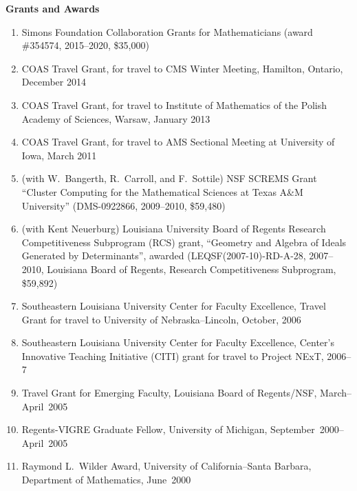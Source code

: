 \documentclass[12pt]{article}
\begin{document}




\textbf{Grants and Awards}
\begin{enumerate}
\item Simons Foundation Collaboration Grants for Mathematicians (award \#354574, 2015--2020, \$35,000)
\item COAS Travel Grant, for travel to CMS Winter Meeting, Hamilton, Ontario, December 2014
\item COAS Travel Grant, for travel to Institute of Mathematics of the Polish Academy of Sciences, Warsaw, January 2013
\item COAS Travel Grant, for travel to AMS Sectional Meeting at University of Iowa, March 2011
\item (with W.~Bangerth, R.~Carroll, and F.~Sottile)
NSF SCREMS Grant ``Cluster Computing for the 
Mathematical Sciences at Texas A\&M University''
(DMS-0922866, 2009--2010, \$59,480)
\item (with Kent Neuerburg)
Louisiana University Board of Regents Research Competitiveness Subprogram (RCS) grant,
``Geometry and Algebra of Ideals Generated by Determinants'',
awarded 
(LEQSF(2007-10)-RD-A-28, 2007--2010, Louisiana Board of Regents, Research Competitiveness Subprogram, \$59,892)
\item Southeastern Louisiana University Center for Faculty Excellence, Travel Grant for travel to University of Nebraska--Lincoln,
October, 2006
\item Southeastern Louisiana University Center for Faculty Excellence, Center's Innovative Teaching Initiative (CITI) grant
for travel to Project NExT, 2006--7
\item Travel Grant for Emerging Faculty, Louisiana Board of Regents/NSF, 
March--April~2005
\item Regents-VIGRE Graduate Fellow, University of Michigan, 
September~2000--April~2005
\item Raymond L.~Wilder Award, University of California--Santa Barbara,
Department of Mathematics, 
June~2000
\end{enumerate}
\end{document}
